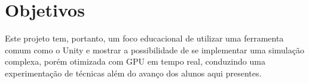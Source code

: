 \section{Objetivos}

Este projeto tem, portanto, um foco educacional de utilizar uma ferramenta comum como o Unity e mostrar a possibilidade de se implementar uma simulação complexa, porém otimizada com GPU em tempo real, conduzindo uma experimentação de técnicas além do avanço dos alunos aqui presentes.

